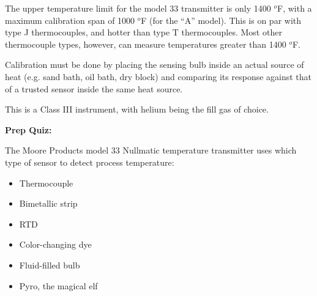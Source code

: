 





The upper temperature limit for the model 33 transmitter is only 1400 $^{o}$F, with a maximum calibration span of 1000 $^{o}$F (for the ``A'' model).  This is on par with type J thermocouples, and hotter than type T thermocouples.  Most other thermocouple types, however, can measure temperatures greater than 1400 $^{o}$F.

\vskip 10pt

Calibration must be done by placing the sensing bulb inside an actual source of heat (e.g. sand bath, oil bath, dry block) and comparing its response against that of a trusted sensor inside the same heat source.

\vskip 10pt

This is a Class III instrument, with helium being the fill gas of choice.





\vfil \eject

\noindent
{\bf Prep Quiz:}

The Moore Products model 33 Nullmatic temperature transmitter uses which type of sensor to detect process temperature:

\begin{itemize}
\item{} Thermocouple
\vskip 5pt 
\item{} Bimetallic strip
\vskip 5pt 
\item{} RTD
\vskip 5pt 
\item{} Color-changing dye
\vskip 5pt 
\item{} Fluid-filled bulb
\vskip 5pt 
\item{} Pyro, the magical elf
\end{itemize}





